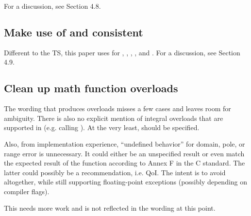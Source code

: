 For a discussion, see  Section 4.8.

\subsection{Make use of  and  consistent}

Different to the TS, this paper uses  for
\stdx\simdabi{}, \stdx{},
\stdx{}, \stdx{}, and
\stdx\simdabi{}.
For a discussion, see  Section 4.9.

\subsection{Clean up math function overloads}
The wording that produces  overloads misses a few cases and leaves room for ambiguity.
There is also no explicit mention of integral overloads that are supported in  (e.g. \std{} calling \std{}).
At the very least, \std{} should be specified.

Also, from implementation experience, ``undefined behavior'' for domain, pole,
or range error is unnecessary.
It could either be an unspecified result or even match the expected result of
the function according to Annex F in the C standard.
The latter could possibly be a recommendation, i.e. QoI.
The intent is to avoid  altogether, while still supporting
floating-point exceptions (possibly depending on compiler flags).

This needs more work and is not reflected in the wording at this point.

